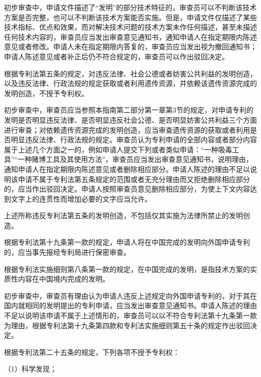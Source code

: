 初步审查中，申请文件描述了“发明”的部分技术特征的，审查员可以不判断该技术方案是否完整，也可以不判断该技术方案能否实施。但是，申请文件仅描述了某些技术指标、优点和效果，而对解决技术问题的技术方案未作任何描述，甚至未描述任何技术内容的，审查员应当发出审查意见通知书，通知申请人在指定期限内陈述意见或者修改。申请人未在指定期限内答复的，审查员应当发出视为撤回通知书；申请人陈述意见或者补正后仍不符合规定的，审查员可以作出驳回决定。

根据专利法第五条的规定，对违反法律、社会公德或者妨害公共利益的发明创造，以及违反法律、行政法规的规定获取或者利用遗传资源，并依赖该遗传资源完成的发明创造，不授予专利权。

初步审查中，审查员应当参照本指南第二部分第一章第3节的规定，对申请专利的发明是否明显违反法律、是否明显违反社会公德、是否明显妨害公共利益三个方面进行审查；对依赖遗传资源完成的发明创造，应当审查遗传资源的获取或者利用是否明显违反法律、行政法规的规定。审查员认为专利申请的全部内容或者部分内容属于上述几个方面之一的，例如申请人提交下列或者类似申请：“一种吸毒工具”“一种赌博工具及其使用方法”，审查员应当发出审查意见通知书，说明理由，通知申请人在指定期限内陈述意见或者删除相应部分。申请人陈述的理由不足以说明该申请不属于专利法第五条规定的范围或者无充分理由而又拒绝删除相应部分的，应当作出驳回决定。申请人按照审查员意见删除相应部分，为使上下文内容达到文字上的连贯性而增加必要的文字应当允许。

上述所称违反专利法第五条的发明创造，不包括仅其实施为法律所禁止的发明创造。

根据专利法第十九条第一款的规定，申请人将在中国完成的发明向外国申请专利的，应当事先报经专利局进行保密审查。

根据专利法实施细则第八条第一款的规定，在中国完成的发明，是指技术方案的实质性内容在中国境内完成的发明。

初步审查中，审查员有理由认为申请人违反上述规定向外国申请专利的，对于其在国内就相同的发明提出的专利申请，应当发出审查意见通知书。申请人陈述的理由不足以说明该申请不属于上述情形的，审查员可以以不符合专利法第十九条第一款为理由，根据专利法第十九条第四款和专利法实施细则第五十条的规定作出驳回决定。

根据专利法第二十五条的规定，下列各项不授予专利权：

{\setlength{\parindent}{17.1bp}（1）科学发现；\par}

